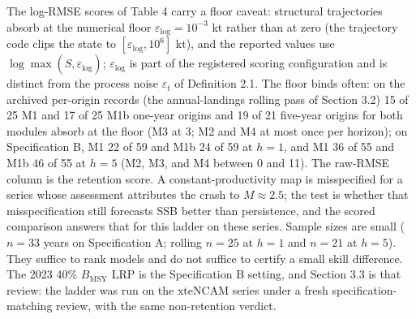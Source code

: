 \documentclass[11pt]{article}
\begin{document}
The log-RMSE scores of Table 4 carry a floor caveat: structural
trajectories absorb at the numerical floor
\(\varepsilon_{\mathrm{log}} = 10^{-3}\) kt rather than at zero (the
trajectory code clips the state to
\([\varepsilon_{\mathrm{log}}, 10^{6}]\) kt), and the reported values
use \(\log\max(\hat S, \varepsilon_{\mathrm{log}})\);
\(\varepsilon_{\mathrm{log}}\) is part of the registered scoring
configuration and is distinct from the process noise \(\varepsilon_t\)
of Definition 2.1. The floor binds often: on the archived per-origin
records (the annual-landings rolling pass of Section 3.2) 15 of 25 M1
and 17 of 25 M1b one-year origins and 19 of 21 five-year origins for
both modules absorb at the floor (M3 at 3; M2 and M4 at most once per
horizon); on Specification B, M1 22 of 59 and M1b 24 of 59 at \(h=1\),
and M1 36 of 55 and M1b 46 of 55 at \(h=5\) (M2, M3, and M4 between 0
and 11). The
raw-RMSE column is the retention score. A constant-productivity map is
misspecified for a series whose assessment attributes the crash to
\(M \approx 2.5\); the test is whether that misspecification still
forecasts SSB better than persistence, and the scored comparison answers
that for this ladder on these series. Sample sizes are small
(\(n=33\) years on Specification A; rolling \(n=25\) at \(h=1\) and
\(n=21\) at \(h=5\)). They suffice to rank models and do not suffice to
certify a small skill difference. The 2023 40\% \(B_{\mathrm{MSY}}\) LRP
is the Specification B setting, and Section 3.3 is that review: the
ladder was run on the xteNCAM series under a fresh
specification-matching review, with the same non-retention verdict.
\end{document}
